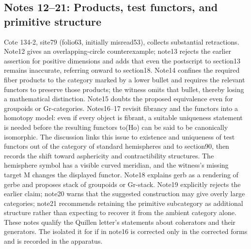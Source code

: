 \subsection*{Notes 12--21: Products, test functors, and primitive structure}
Cote 134-2, site79 (folio63, initially misread53), collects substantial retractions. Note12 gives an overlapping-circle counterexample; note13 rejects the earlier assertion for positive dimensions and adds that even the postscript to section13 remains inaccurate, referring onward to section18. Note14 confines the required fiber products to the category marked by a lower bullet and requires the relevant functors to preserve those products; the witness omits that bullet, thereby losing a mathematical distinction. Note15 doubts the proposed equivalence even for groupoids or Gr-categories. Notes16--17 revisit fibrancy and the functors into a homotopy model: even if every object is fibrant, a suitable uniqueness statement is needed before the resulting functors to(Ho) can be said to be canonically isomorphic. The discussion links this issue to existence and uniqueness of test functors out of the category of standard hemispheres and to section90, then records the shift toward asphericity and contractibility structures. The hemisphere symbol has a visible curved meridian, and the witness's missing target M changes the displayed functor. Note18 explains gerb as a rendering of gerbe and proposes stack of groupoids or Gr-stack. Note19 explicitly rejects the earlier claim; note20 warns that the suggested construction may give overly large categories; note21 recommends retaining the primitive subcategory as additional structure rather than expecting to recover it from the ambient category alone. These notes qualify the Quillen letter's statements about coherators and their generators. The isolated it for if in note16 is corrected only in the corrected forms and is recorded in the apparatus.

